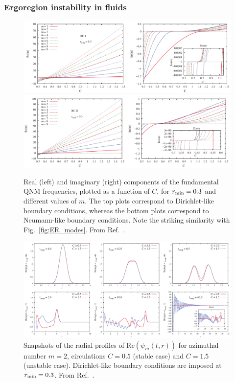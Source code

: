 \documentclass[11pt]{article}
\numberwithin{equation}{section} %
\begin{document}
\subsubsection{Ergoregion instability in fluids}
%  
\begin{figure}
\includegraphics[width=16cm]{Freq_C_BCI.pdf}\\
\includegraphics[width=16cm]{Freq_C_BCII.pdf}
\caption{Real (left) and imaginary (right) components of the fundamental QNM frequencies, plotted as a function of $C$, for $r_{\rm min}=0.3$ and different values of  $m$.
The top plots correspond to Dirichlet-like boundary conditions, whereas the bottom plots correspond to Neumann-like boundary conditions. Note the striking similarity with Fig.~\ref{fig:ER_modes}. From Ref.~\cite{Oliveira:2014oja}.
}
\label{fig-stable1}
\end{figure}
%
%
\begin{figure}
\includegraphics[width=16cm]{snapshot_m2.pdf}
\caption{Snapshots of the radial profiles of $\text{Re}(\psi_{m}(t, r))$ for azimuthal number $m = 2$, circulations $C=0.5$ (stable case) and $C=1.5$ (unstable case). Dirichlet-like boundary conditions are imposed at $r_{\rm min}=0.3$. From Ref.~\cite{Oliveira:2014oja}.}
\label{fig_snapshots}
\end{figure} 
\end{document}
